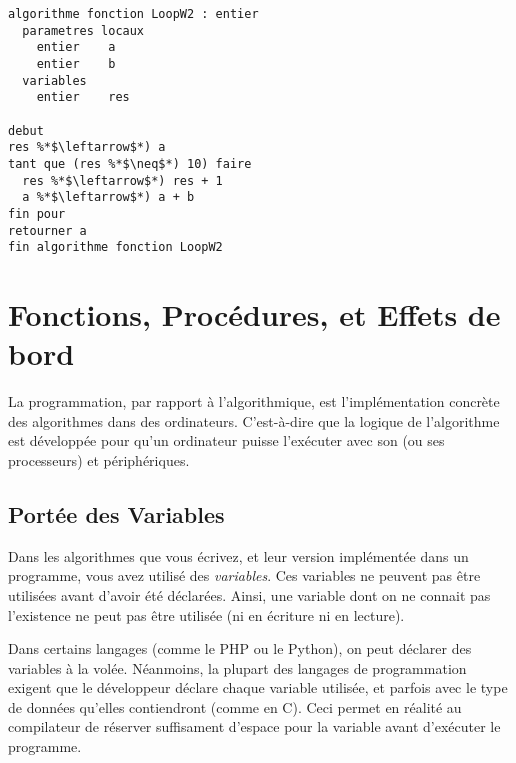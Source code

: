 \documentclass[11pt,a4paper]{article}
\begin{document}
\begin{table}[ht!]
  \centering
  \begin{minipage}{0.5\textwidth}
    \centering
\begin{lstlisting}[style=algorithmique]
algorithme fonction LoopW2 : entier
  parametres locaux
    entier    a
    entier    b
  variables
    entier    res

debut
res %*$\leftarrow$*) a
tant que (res %*$\neq$*) 10) faire
  res %*$\leftarrow$*) res + 1
  a %*$\leftarrow$*) a + b
fin pour
retourner a
fin algorithme fonction LoopW2 \end{lstlisting}

  \end{minipage}
  \hfillx
  \begin{minipage}{0.5\textwidth}

  \end{minipage}
\end{table}


\clearpage


\section{Fonctions, Procédures, et Effets de bord}

\bigskip

La programmation, par rapport à l'algorithmique, est l'implémentation concrète des algorithmes dans des ordinateurs.
C'est-à-dire que la logique de l'algorithme est développée pour qu'un ordinateur puisse l'exécuter avec son (ou ses processeurs) et périphériques.

\medskip

\subsection{Portée des Variables}

Dans les algorithmes que vous écrivez, et leur version implémentée dans un programme, vous avez utilisé des \textit{variables}.
Ces variables ne peuvent pas être utilisées avant d'avoir été déclarées.
Ainsi, une variable dont on ne connait pas l'existence ne peut pas être utilisée (ni en écriture ni en lecture).

\medskip

Dans certains langages (comme le PHP ou le Python), on peut déclarer des variables à la volée.
Néanmoins, la plupart des langages de programmation exigent que le développeur déclare chaque variable utilisée, et parfois avec le type de données qu'elles contiendront (comme en C).
Ceci permet en réalité au compilateur de réserver suffisament d'espace pour la variable avant d'exécuter le programme.
\end{document}
